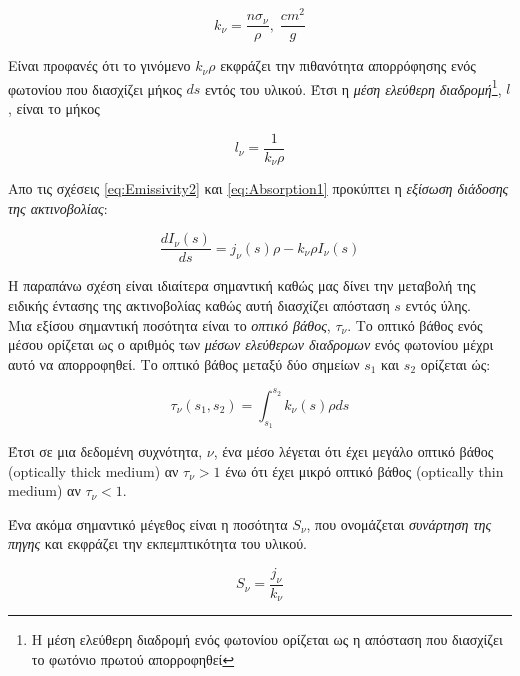 \begin{equation}\label{eq:Absorption2}
 k_{\nu} = \frac{n \sigma_{\nu}}{\rho}, \; \frac{cm^{2}}{g}
\end{equation}

Είναι προφανές ότι το γινόμενο $k_{\nu}\rho$ εκφράζει την πιθανότητα απορρόφησης ενός φωτονίου που διασχίζει μήκος $ds$ εντός του υλικού. Έτσι η {\it μέση ελεύθερη διαδρομή}\footnote{Η μέση ελεύθερη διαδρομή ενός φωτονίου ορίζεται ως η απόσταση που διασχίζει το φωτόνιο πρωτού απορροφηθεί}, $l$, είναι το μήκος

\begin{equation}\label{eq:MeanFreePath}
 l_{\nu} = \frac{1}{k_{\nu}\rho} 
\end{equation}

Απο τις σχέσεις \eqref{eq:Emissivity2} και \eqref{eq:Absorption1} προκύπτει η {\it εξίσωση διάδοσης της ακτινοβολίας}:

\begin{equation}\label{eq:RadiationTransferEquation}
  \frac{dI_{\nu}(s)}{ds}=j_{\nu}(s)\rho - k_{\nu}\rho I_{\nu}(s) 
\end{equation}

Η παραπάνω σχέση είναι ιδιαίτερα σημαντική καθώς μας δίνει την μεταβολή της ειδικής έντασης της ακτινοβολίας καθώς αυτή διασχίζει απόσταση $s$ εντός ύλης.\\

Μια εξίσου σημαντική ποσότητα είναι το {\it οπτικό βάθος}, $\tau_{\nu}$. Το οπτικό βάθος ενός μέσου ορίζεται ως ο αριθμός των {\it μέσων ελεύθερων διαδρομων} ενός φωτονίου μέχρι αυτό να απορροφηθεί. Το οπτικό βάθος μεταξύ δύο σημείων $s_1$ και $s_2$ ορίζεται ώς:

\begin{equation}\label{eq:OpticalDepth}
  \tau_{\nu}(s_1,s_2) = \int_{s_1}^{s_2} k_{\nu}(s)\rho ds
\end{equation}

Έτσι σε μια δεδομένη συχνότητα, $\nu$, ένα μέσο λέγεται ότι έχει μεγάλο οπτικό βάθος ({\en optically thick medium}) αν $\tau_{\nu} > 1$ ένω ότι έχει μικρό οπτικό βάθος ({\en optically thin medium}) αν $\tau_{\nu} < 1$.

Ένα ακόμα σημαντικό μέγεθος είναι η ποσότητα $S_\nu$, που ονομάζεται {\it συνάρτηση της πηγης} και εκφράζει την εκπεμπτικότητα του υλικού.

\begin{equation}\label{eq:SourceFunction}
 S_\nu = \frac{j_\nu}{k_\nu}
\end{equation}


